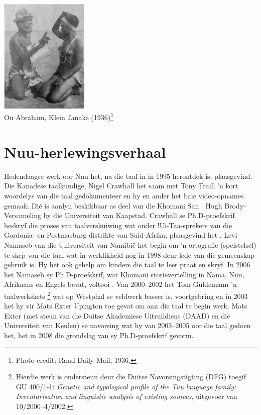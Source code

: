 \begin{center}
    \includegraphics[height=5.5cm]{abraham_janake_bwav.png}\\
    Ou Abraham, Klein Janake (1936)\footnote{Photo credit: Rand Daily
    Mail, 1936.}
\end{center}

\newpage


\markboth{}{}
\section{N\textipa{\textvertline}uu-herlewingsverhaal}
\markboth{}{}

Hedendaagse werk oor N\textipa{\textvertline}uu het, na die taal in in
1995 herontdek is, plaasgevind. Die Kanadese taalkundige, Nigel
Crawhall het saam met Tony Traill 'n kort woordelys van die taal
gedokumenteer en hy en ander het baie video-opnames gemaak. Di\'{e} is
aanlyn beskikbaar as deel van die \textipa{\textdoublebarpipe}Khomani
San $|$ Hugh Brody-Versameling by die Universiteit van Kaapstad.
Crawhall se Ph.D-proefskrif beskryf die proses van taalverskuiwing wat
onder !Ui-Taa-sprekers van die Gordonia- en Postmasburg distrikte van
Suid-Afrika, plaasgevind het \parencite{Crawhall2004}.
Levi Namaseb van die Universiteit van Namibi\"{e} het begin om
'n ortografie (spelstelsel) te skep van die taal wat in werklikheid
nog in 1998 deur lede van die gemeenskap gebruik is. Hy het ook gehelp
om kinders die taal te leer praat en skryf.
In 2006 het Namaseb sy Ph.D-proefskrif, wat
\textipa{\textdoublebarpipe}Khomani storievertelling in Nama,
N\textipa{\textvertline}uu, Afrikaans en Engels bevat, voltooi
\parencite{Namaseb2006}.
Van 2000--2002 het Tom G\"{u}ldemann 'n taalwerkskets
\parencite{Gueldemannforthcoming2003}\footnote{Hierdie werk is
ondersteun deur die Duitse Navorsingstigting (DFG) toegif GU 400/1-1:
\emph{Genetic and typological profile of the Tuu language family:
Inventarisation and linguistic analysis of existing sources},
uitgevoer van 10/2000--4/2002.} wat op Westphal se veldwerk baseer is,
voortgebring en in 2003 het hy vir Mats Exter Upington toe gevat om
aan die taal te begin werk.  Mats Exter (met steun van die Duitse
Akademiese Uitruildiens (DAAD) en die Universiteit van Keulen) se
navorsing wat hy van 2003--2005 oor die taal gedoen het, het in 2008
die grondslag van sy Ph.D-proefskrif gevorm.\\

